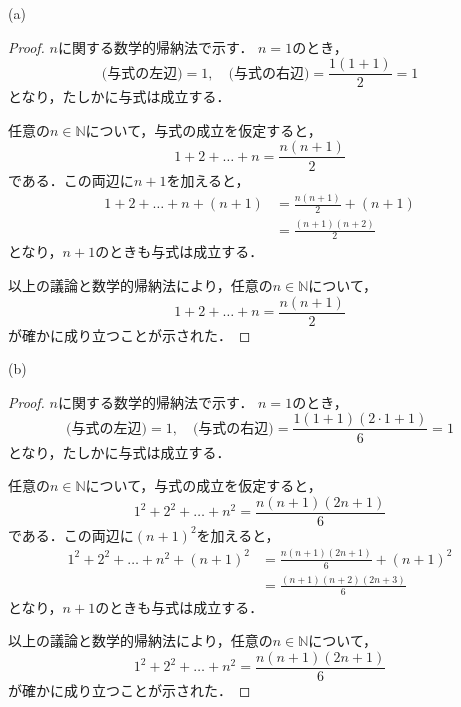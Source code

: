 \documentclass[dvipdfmx,uplatex,11pt]{jsarticle}
\theoremstyle{mytheorem}
\begin{document}
(a)
\begin{leftbar}
    \begin{proof}
    $n$に関する数学的帰納法で示す．
    $n=1$のとき，
    \[
        \text{(与式の左辺)} = 1,\quad \text{(与式の右辺)}=\frac{1(1+1)}{2}=1
    \]
    となり，たしかに与式は成立する．

    任意の$n \in \mathbb{N}$について，与式の成立を仮定すると，
    \[
        1+2+\dots+n =\frac{n(n+1)}{2}
    \]
    である．この両辺に$n+1$を加えると，
    \begin{align*}
        1+2+\dots+n+(n+1) & = \frac{n(n+1)}{2}+(n+1) \\
        & = \frac{(n+1)(n+2)}{2}
    \end{align*}
    となり，$n+1$のときも与式は成立する．

    以上の議論と数学的帰納法により，任意の$n \in \mathbb{N}$について，
    \[
        1+2+\dots+n =\frac{n(n+1)}{2}
    \]
    が確かに成り立つことが示された．
\end{proof}
\end{leftbar}
%
(b)
\begin{leftbar}
    \begin{proof}
    $n$に関する数学的帰納法で示す．
    $n=1$のとき，
    \[
        \text{(与式の左辺)} = 1,\quad \text{(与式の右辺)}=\frac{1(1+1)(2 \cdot 1 +1)}{6}=1
    \]
    となり，たしかに与式は成立する．

    任意の$n \in \mathbb{N}$について，与式の成立を仮定すると，
    \[
        1^2+2^2+\dots+n^2 =\frac{n(n+1)(2n+1)}{6}
    \]
    である．この両辺に$(n+1)^2$を加えると，
    \begin{align*}
        1^2+2^2+\dots+n^2+(n+1)^2 &=\frac{n(n+1)(2n+1)}{6}+(n+1)^2 \\
        & = \frac{(n+1)(n+2)(2n+3)}{6}
    \end{align*}
    となり，$n+1$のときも与式は成立する．

    以上の議論と数学的帰納法により，任意の$n \in \mathbb{N}$について，
    \[
        1^2+2^2+\dots+n^2 =\frac{n(n+1)(2n+1)}{6}
    \]
    が確かに成り立つことが示された．
\end{proof}
\end{leftbar}

\newpage
\end{document}

